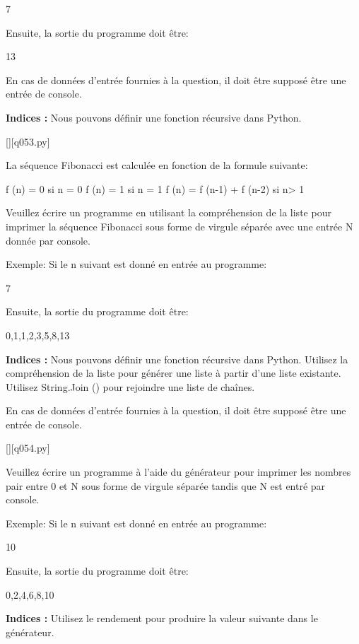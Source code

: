 7

Ensuite, la sortie du programme doit être:

13

En cas de données d'entrée fournies à la question, il doit être supposé être une entrée de console.
\par
\textbf{Indices : }Nous pouvons définir une fonction récursive dans Python.
\renewcommand{\nomfichier}{q053.py}
\begin{solution}
    \pythonfile{\chemincode \nomfichier}[][\nomfichier]
\end{solution}


\question
La séquence Fibonacci est calculée en fonction de la formule suivante:


f (n) = 0 si n = 0
f (n) = 1 si n = 1
f (n) = f (n-1) + f (n-2) si n> 1

Veuillez écrire un programme en utilisant la compréhension de la liste pour imprimer la séquence Fibonacci sous forme de virgule séparée avec une entrée N donnée par console.

Exemple:
Si le n suivant est donné en entrée au programme:

7

Ensuite, la sortie du programme doit être:

0,1,1,2,3,5,8,13
\par
\textbf{Indices : }Nous pouvons définir une fonction récursive dans Python.
Utilisez la compréhension de la liste pour générer une liste à partir d'une liste existante.
Utilisez String.Join () pour rejoindre une liste de chaînes.

En cas de données d'entrée fournies à la question, il doit être supposé être une entrée de console.
\renewcommand{\nomfichier}{q054.py}
\begin{solution}
    \pythonfile{\chemincode \nomfichier}[][\nomfichier]
\end{solution}


\question
Veuillez écrire un programme à l'aide du générateur pour imprimer les nombres pair entre 0 et N sous forme de virgule séparée tandis que N est entré par console.

Exemple:
Si le n suivant est donné en entrée au programme:

10

Ensuite, la sortie du programme doit être:

0,2,4,6,8,10
\par
\textbf{Indices : }Utilisez le rendement pour produire la valeur suivante dans le générateur.

